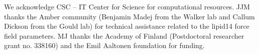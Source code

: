\documentclass[journal=jctcce]{achemso}
\begin{document}
\begin{acknowledgement}
We acknowledge CSC -- IT Center for Science for computational resources.
%
JJM thanks the Amber community (Benjamin Madej from the Walker lab and Callum Dickson from the Gould lab) for technical assistance related to the lipid14 force field parameters. 
%
MJ thanks the Academy of Finland (Postdoctoral researcher grant no. 338160) and the Emil Aaltonen foundation for funding.
\end{acknowledgement}




\listoftodos
\end{document}
